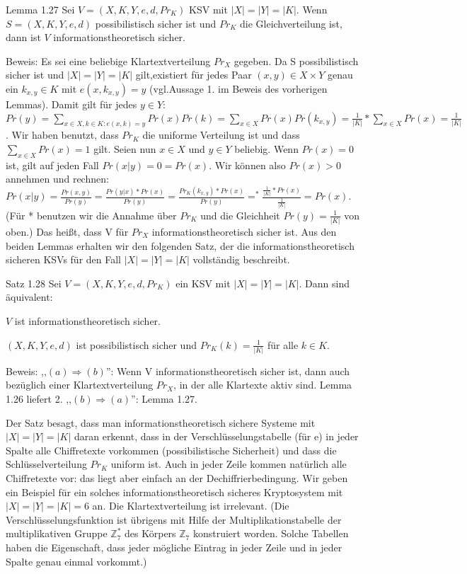 \documentclass[a4paper]{article}
\begin{document}
\begin{multicols}{3}
    Lemma 1.27 Sei $V=(X,K,Y,e,d,Pr_K)$ KSV mit $|X|=|Y|=|K|$. Wenn $S=(X,K,Y,e,d)$ possibilistisch sicher ist und $Pr_K$ die Gleichverteilung ist, dann ist $V$ informationstheoretisch sicher.

    Beweis: Es sei eine beliebige Klartextverteilung $Pr_X$ gegeben. Da S possibilistisch sicher ist und $|X|=|Y|=|K|$ gilt,existiert für jedes Paar $(x,y)\in X\times Y$ genau ein $k_{x,y}\in K$ mit $e(x,k_{x,y}) =y$ (vgl.Aussage 1. im Beweis des vorherigen Lemmas).
    Damit gilt für jedes $y\in Y$:$Pr(y)=\sum_{x\in X,k\in K:e(x,k)=y} Pr(x)Pr(k) =\sum_{x\in X} Pr(x) Pr(k_{x,y})=\frac{1}{|K|}* \sum_{x\in X} Pr(x) = \frac{1}{|K|}$.
    Wir haben benutzt, dass $Pr_K$ die uniforme Verteilung ist und dass $\sum_{x\in X} Pr(x) = 1$ gilt.
    Seien nun $x\in X$ und $y\in Y$ beliebig. Wenn $Pr(x)=0$ ist, gilt auf jeden Fall $Pr(x|y)=0=Pr(x)$. Wir können also $Pr(x)> 0$ annehmen und rechnen: $Pr(x|y) =\frac{Pr(x,y)}{Pr(y)}=\frac{Pr(y|x)*Pr(x)}{Pr(y)}=\frac{Pr_K(k_{x,y})*Pr(x)}{Pr(y)}=^* \frac{\frac{1}{|K|}*Pr(x)}{\frac{1}{|K|}}=Pr(x)$.
    (Für * benutzen wir die Annahme über $Pr_K$ und die Gleichheit $Pr(y)=\frac{1}{|K|}$ von oben.) Das heißt, dass V für $Pr_X$ informationstheoretisch sicher ist.
    Aus den beiden Lemmas erhalten wir den folgenden Satz, der die informationstheoretisch sicheren KSVs für den Fall $|X|=|Y|=|K|$ vollständig beschreibt.

    Satz 1.28 Sei $V= (X,K,Y,e,d,Pr_K)$ ein KSV mit $|X|=|Y|=|K|$. Dann sind äquivalent:
    \begin{enumerate*}
        \item $V$ ist informationstheoretisch sicher.
        \item $(X,K,Y,e,d)$ ist possibilistisch sicher und $Pr_K(k)=\frac{1}{|K|}$ für alle $k\in K$.
    \end{enumerate*}

    Beweis: ,,$(a)\Rightarrow (b)$'': Wenn V informationstheoretisch sicher ist, dann auch bezüglich einer Klartextverteilung $Pr_X$, in der alle Klartexte aktiv sind. Lemma 1.26 liefert 2. ,,$(b)\Rightarrow (a)$'': Lemma 1.27.

    Der Satz besagt, dass man informationstheoretisch sichere Systeme mit $|X|=|Y|=|K|$ daran erkennt, dass in der Verschlüsselungstabelle (für e) in jeder Spalte alle Chiffretexte vorkommen (possibilistische Sicherheit) und dass die Schlüsselverteilung $Pr_K$ uniform ist. Auch in jeder Zeile kommen natürlich alle Chiffretexte vor: das liegt aber einfach an der Dechiffrierbedingung.
    Wir geben ein Beispiel für ein solches informationstheoretisch sicheres Kryptosystem mit $|X|=|Y|=|K|=6$ an. Die Klartextverteilung ist irrelevant. (Die Verschlüsselungsfunktion ist übrigens mit Hilfe der Multiplikationstabelle der multiplikativen Gruppe $\mathbb{Z}^*_7$ des Körpers $\mathbb{Z}_7$ konstruiert worden. Solche Tabellen haben die Eigenschaft, dass jeder mögliche Eintrag in jeder Zeile und in jeder Spalte genau einmal vorkommt.)


\end{multicols}
\end{document}
